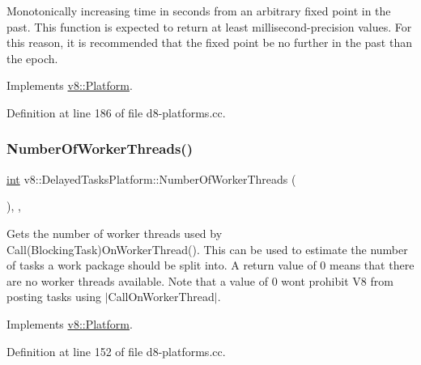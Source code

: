 Monotonically increasing time in seconds from an arbitrary fixed point in the past. This function is expected to return at least millisecond-\/precision values. For this reason, it is recommended that the fixed point be no further in the past than the epoch. 

Implements \mbox{\hyperlink{classv8_1_1Platform_a6d4d7c2dcf6b0c7113099b97fa7f57b7}{v8\+::\+Platform}}.



Definition at line 186 of file d8-\/platforms.\+cc.

\mbox{\label{classv8_1_1DelayedTasksPlatform_a1a3aa3e67db9adaac185eeac940e6a97}} 
\subsubsection{\texorpdfstring{Number\+Of\+Worker\+Threads()}{NumberOfWorkerThreads()}}
{\footnotesize\ttfamily \mbox{\hyperlink{classint}{int}} v8\+::\+Delayed\+Tasks\+Platform\+::\+Number\+Of\+Worker\+Threads (\begin{DoxyParamCaption}{ }\end{DoxyParamCaption})\hspace{0.3cm}{\ttfamily [inline]}, {\ttfamily [override]}, {\ttfamily [virtual]}}

Gets the number of worker threads used by Call(\+Blocking\+Task)On\+Worker\+Thread(). This can be used to estimate the number of tasks a work package should be split into. A return value of 0 means that there are no worker threads available. Note that a value of 0 won\textquotesingle{}t prohibit V8 from posting tasks using $\vert$\+Call\+On\+Worker\+Thread$\vert$. 

Implements \mbox{\hyperlink{classv8_1_1Platform_a57cdd7eb4c482bfb806c378beeda716d}{v8\+::\+Platform}}.



Definition at line 152 of file d8-\/platforms.\+cc.

\mbox{\label{classv8_1_1DelayedTasksPlatform_a3f545fedfc3298d49a02b4b9f4aa500c}} 
